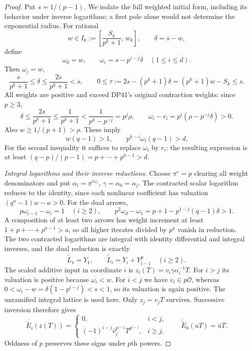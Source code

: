 \documentclass[11pt,a4paper]{article}
\theoremstyle{definition}\newtheorem{remark}[theorem]{Remark}
\begin{document}
\begin{proof}
Put $s=1/(p-1)$. We isolate the full weighted initial form, including its behavior under inverse logarithms; a first pole alone would not determine the exponential radius.
For rational
\[
 w\in I_k:=\left[\frac{S_k}{p^k+1},\,w_k\right],
 \qquad \delta=s-w,
\]
define
\[
 \omega_0=w,\qquad \omega_i=s-p^{i-j}\delta\quad(1\le i\le d).
\]
Then $\omega_j=w$,
\[
 \frac{s}{p^k+1}\le\delta\le\frac{2s}{p^k+1}<s,\qquad
 0\le\tau:=2s-(p^k+1)\delta=(p^k+1)w-S_k\le s.
\]
All weights are positive and exceed DP41's original contraction weights:
since $p\ge3$,
\[
 \delta\le\frac{2s}{p^k+1}\le\frac1{p^k+1}
 <\frac1{p^k-p^{-j}}=p^j\rho,
 \qquad \omega_i-r_i=p^i(\rho-p^{-j}\delta)>0.
\]
Also $w\ge1/(p+1)>\rho$. These imply
\begin{equation}\label{eq:pathstrict}
 w(q-1)>1,\qquad p^{h-i}\omega_i(q-1)>d.
\end{equation}
For the second inequality it suffices to replace $\omega_i$ by $r_i$:
the resulting expression is at least
$(q-p)/(p-1)=p+\cdots+p^{h-1}>d$.

\emph{Integral logarithms and their inverse reductions.}
Choose $\pi^e=p$ clearing all weight denominators and put
$\alpha_i=\pi^{e\omega_i}$, $\gamma=\alpha_0=\alpha_j$.
The contracted scalar logarithm reduces to the identity, since each nonlinear coefficient has valuation $(q^a-1)w-a>0$.
For the dual arrows,
\[
 p\omega_{i-1}-\omega_i=1\quad(i\ge2),\qquad
 p^2\omega_d-\omega_1
       =p+1-p^{1-j}(q-1)\delta>1.
\]
A composition of at least two arrows has weight increment at least
$1+p+\cdots+p^{a-1}>a$, so all higher iterates divided by $p^a$ vanish in reduction. The two contracted logarithms are integral with identity differential and integral inverses, and the dual reduction is exactly
\[
 \overline{\widetilde L}_1=Y_1,\qquad
 \overline{\widetilde L}_i=Y_i+Y_{i-1}^p\quad(i\ge2).
\]
The scaled additive input in coordinate $i$ is
$z_i(T)=v_i\gamma\alpha_i^{-1}T$.
For $i>j$ its valuation is positive because $\omega_i<w$.
For $i<j$ we have $v_i\in p\mathcal O$, whereas
$0<\omega_i-w=\delta(1-p^{i-j})<s<1$, so its valuation is again positive. The unramified integral lattice is used here. Only $z_j=v_jT$ survives. Successive inversion therefore gives
\begin{equation}\label{eq:pathinversereduction}
 \overline{\widetilde E}_i(z(T))=
 \begin{cases}
 0,&i<j,\\
 (-1)^{i-j}\bar v_j^{p^{i-j}}T^{p^{i-j}},&i\ge j,
 \end{cases}
 \qquad
 \overline{\widetilde E}_0(uT)=\bar uT.
\end{equation}
Oddness of $p$ preserves these signs under $p$th powers.


\end{proof}
\end{document}
